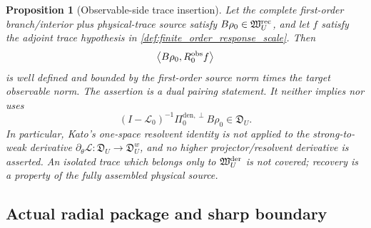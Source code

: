 \documentclass[11pt]{amsart}
\theoremstyle{compactplain}
\newtheorem{proposition}[theorem]{Proposition}
\theoremstyle{compactdefinition}
\theoremstyle{compactremark}
\newcommand{\Ltransfer}{\mathscr L}
\newcommand{\Pidenperp}{\Pi^{\mathrm{den},\perp}}
\begin{document}
\begin{proposition}[Observable-side trace insertion]
\label{prop:observable_trace_insertion}
Let the complete first-order branch/interior plus physical-trace source satisfy
\(B\rho_0\in\mathfrak W_U^{\rm rec}\), and let \(f\) satisfy the adjoint trace hypothesis in
\cref{def:finite_order_response_scale}.  Then
\[
  \left\langle B\rho_0,R_0^{\rm obs}f\right\rangle
\]
is well defined and bounded by the first-order source norm times the target
observable norm.  The assertion is a dual pairing statement.  It neither
implies nor uses
\[
  (I-\Ltransfer_0)^{-1}\Pidenperp_0 B\rho_0\in\mathfrak D_U.
\]
In particular, Kato's one-space resolvent identity is not applied to the
strong-to-weak derivative
\(\partial_\theta\Ltransfer:\mathfrak D_U\to\mathfrak D_U^w\), and no higher
projector/resolvent derivative is asserted.
An isolated trace which belongs only to \(\mathfrak W_U^{\rm der}\) is not
covered; recovery is a property of the fully assembled physical source.
\end{proposition}

\subsection{Actual radial package and sharp boundary}
\end{document}
